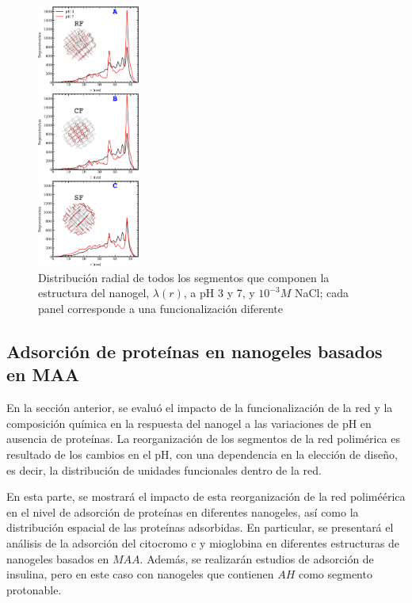 \begin{figure}[!htb]
	\centering
	\includegraphics[width=0.30\textwidth]{Figures/graphs-gel2/allseg_SI.pdf}
	\caption{Distribuci\'on radial de todos los segmentos que componen la estructura del nanogel, $\lambda(r)$, a pH 3 y 7, y $10^{-3}M$ NaCl; cada panel corresponde a una funcionalizaci\'on  diferente}
	\label{fig:esf:allr-distribution}
\end{figure}




\subsection{Adsorci\'on de prote\'inas en nanogeles basados en MAA}\label{sec:MAA-NGs}






En la secci\'on anterior, se evalu\'o el impacto de la funcionalizaci\'on de la red y la composici\'on qu\'imica en la respuesta del nanogel a las variaciones de pH en ausencia de prote\'inas. La reorganizaci\'on de los segmentos de la red polim\'erica es resultado de los cambios en el pH, con una dependencia en la elecci\'on de dise\~no, es decir, la distribuci\'on de unidades funcionales dentro de la red.

En esta parte, se mostrar\'a el impacto de esta reorganizaci\'on de la red polimé\'erica en el nivel de adsorci\'on de prote\'inas en diferentes nanogeles, as\'i como la distribuci\'on espacial de las prote\'inas adsorbidas. En particular, se presentar\'a el an\'alisis de la adsorci\'on del citocromo c y mioglobina en diferentes estructuras de nanogeles basados en $MAA$. Adem\'as, se realizar\'an estudios de adsorci\'on de insulina, pero en este caso con nanogeles que contienen $AH$ como segmento protonable.%

